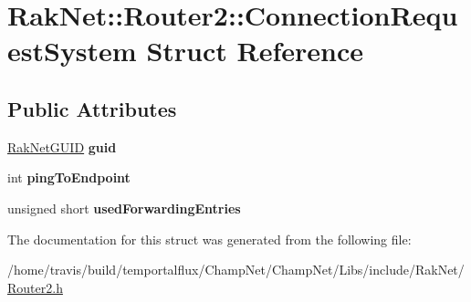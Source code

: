 \hypertarget{struct_rak_net_1_1_router2_1_1_connection_request_system}{\section{Rak\-Net\-:\-:Router2\-:\-:Connection\-Request\-System Struct Reference}
\label{struct_rak_net_1_1_router2_1_1_connection_request_system}
}
\subsection*{Public Attributes}
\begin{DoxyCompactItemize}
\item 
\hypertarget{struct_rak_net_1_1_router2_1_1_connection_request_system_a49538c6155b84eeff1458f700350b01a}{\hyperlink{struct_rak_net_1_1_rak_net_g_u_i_d}{Rak\-Net\-G\-U\-I\-D} {\bfseries guid}}\label{struct_rak_net_1_1_router2_1_1_connection_request_system_a49538c6155b84eeff1458f700350b01a}

\item 
\hypertarget{struct_rak_net_1_1_router2_1_1_connection_request_system_a9fb0b06b0c52047012ac6dd5d17a1f59}{int {\bfseries ping\-To\-Endpoint}}\label{struct_rak_net_1_1_router2_1_1_connection_request_system_a9fb0b06b0c52047012ac6dd5d17a1f59}

\item 
\hypertarget{struct_rak_net_1_1_router2_1_1_connection_request_system_ac864734c077ab164023555574bc9359a}{unsigned short {\bfseries used\-Forwarding\-Entries}}\label{struct_rak_net_1_1_router2_1_1_connection_request_system_ac864734c077ab164023555574bc9359a}

\end{DoxyCompactItemize}


The documentation for this struct was generated from the following file\-:\begin{DoxyCompactItemize}
\item 
/home/travis/build/temportalflux/\-Champ\-Net/\-Champ\-Net/\-Libs/include/\-Rak\-Net/\hyperlink{_router2_8h}{Router2.\-h}\end{DoxyCompactItemize}
